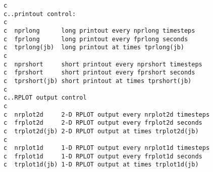 \begin{verbatim}
c
c..printout control:
c
c  nprlong      long printout every nprlong timesteps
c  fprlong      long printout every fprlong seconds
c  tprlong(jb)  long printout at times tprlong(jb)
c
c  nprshort     short printout every nprshort timesteps
c  fprshort     short printout every fprshort seconds
c  tprshort(jb) short printout at times tprshort(jb)
c
c..RPLOT output control
c
c  nrplot2d     2-D RPLOT output every nrplot2d timesteps
c  frplot2d     2-D RPLOT output every frplot2d seconds
c  trplot2d(jb) 2-D RPLOT output at times trplot2d(jb)
c
c  nrplot1d     1-D RPLOT output every nrplot1d timesteps
c  frplot1d     1-D RPLOT output every frplot1d seconds
c  trplot1d(jb) 1-D RPLOT output at times trplot1d(jb)

\end{verbatim}







\begin{verbatim}


\end{verbatim}
